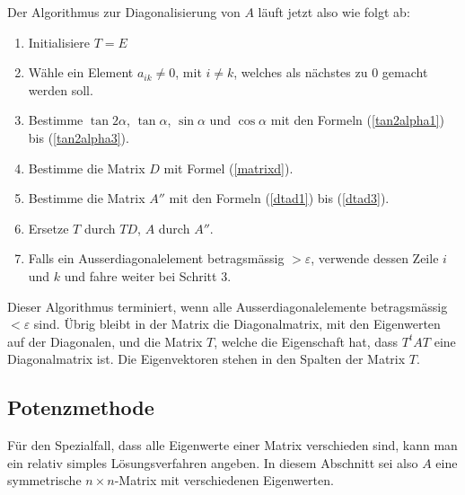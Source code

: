 Der Algorithmus zur Diagonalisierung von $A$ läuft jetzt also
wie folgt ab:
\begin{enumerate}
\item Initialisiere $T=E$
\item Wähle ein Element $a_{ik}\ne 0$, mit $i\ne k$, welches als
nächstes zu $0$ gemacht werden soll.
\item Bestimme $\tan2\alpha$, $\tan\alpha$, $\sin\alpha$ und $\cos\alpha$
mit den Formeln (\ref{tan2alpha1}) bis (\ref{tan2alpha3}).
\item Bestimme die Matrix $D$ mit Formel (\ref{matrixd}).
\item Bestimme die Matrix $A''$ mit den Formeln (\ref{dtad1}) bis
(\ref{dtad3}).
\item Ersetze $T$ durch $TD$, $A$ durch $A''$.
\item Falls ein Ausserdiagonalelement betragsmässig $>\varepsilon$,
verwende dessen Zeile $i$ und $k$ und fahre weiter bei Schritt 3.
\end{enumerate}
Dieser Algorithmus terminiert, wenn alle Ausserdiagonalelemente 
betragsmässig $<\varepsilon$ sind.
Übrig bleibt in der Matrix
die Diagonalmatrix, mit den Eigenwerten auf der Diagonalen, 
und die Matrix $T$, welche die Eigenschaft hat, dass $T^tAT$
eine Diagonalmatrix ist.
Die Eigenvektoren stehen in den Spalten der Matrix $T$.

\subsection{Potenzmethode\label{section:potenzmethode}}
Für den Spezialfall, dass alle Eigenwerte einer Matrix verschieden
sind, kann man ein relativ simples Lösungsverfahren angeben.
In diesem
Abschnitt sei also $A$ eine symmetrische $n\times n$-Matrix mit
verschiedenen Eigenwerten.
